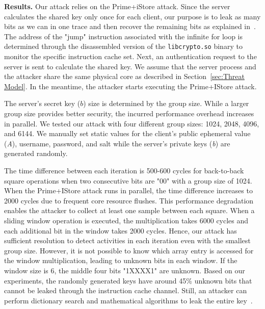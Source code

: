 \noindent\textbf{Results.} Our attack relies on the Prime+iStore attack. Since the server calculates the shared key only once for each client, our purpose is to leak as many bits as we can in one trace and then recover the remaining bits as explained in~\cite{de2021parasite,yarom2014flush+,inci2015seriously}. The address of the "jump" instruction associated with the infinite for loop is determined through the disassembled version of the \texttt{libcrypto.so} binary to monitor the specific instruction cache set. Next, an authentication request to the server is sent to calculate the shared key. We assume that the server process and the attacker share the same physical core as described in Section~\ref{sec:Threat Model}. In the meantime, the attacker starts executing the Prime+IStore attack. 

The server's secret key ($b$) size is determined by the group size. While a larger group size provides better security, the incurred performance overhead increases in parallel. We tested our attack with four different group sizes: 1024, 2048, 4096, and 6144.
We manually set static values for the client's public ephemeral value (\textit{A}), username, password, and salt while the server's private keys (\textit{b}) are generated randomly.

The time difference between each iteration is 500-600 cycles for back-to-back square operations when two consecutive bits are "00" with a group size of 1024. When the Prime+IStore attack runs in parallel, the time difference increases to 2000 cycles due to frequent core resource flushes. This performance degradation enables the attacker to collect at least one sample between each square. When a sliding window operation is executed, the multiplication takes 6000 cycles and each additional bit in the window takes 2000 cycles. Hence, our attack has sufficient resolution to detect activities in each iteration even with the smallest group size. However, it is not possible to know which array entry is accessed for the window multiplication, leading to unknown bits in each window. If the window size is 6, the middle four bits "1XXXX1" are unknown. Based on our experiments, the randomly generated keys have around 45\% unknown bits that cannot be leaked through the instruction cache channel. Still, an attacker can perform dictionary search and mathematical algorithms to leak the entire key~\cite{inci2015seriously,de2021parasite}. 

